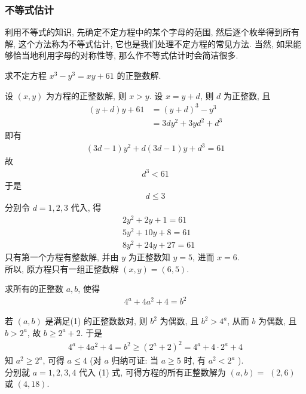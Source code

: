 \subsubsection{不等式估计}
利用不等式的知识, 先确定不定方程中的某个字母的范围, 然后逐个枚举得到所有解, 这个方法称为不等式估计, 它也是我们处理不定方程的常见方法. 当然, 如果能够恰当地利用字母的对称性等, 那么作不等式估计时会简洁很多.

\begin{example}
	求不定方程 $x^{3}-y^{3}=x y+61$ 的正整数解.
\end{example}
\begin{solution}
	设 $(x, y)$ 为方程的正整数解, 则 $x>y$. 设 $x=y+d$, 则 $d$ 为正整数, 且
	\begin{align}
		(y+d) y+61 & =(y+d)^{3}-y^{3}           \\
		           & =3 d y^{2}+3 y d^{2}+d^{3}
	\end{align}
	即有
	\begin{align*}
		(3 d-1) y^{2}+d(3 d-1) y+d^{3}=61
	\end{align*}
	故
	\begin{align*}
		d^{3}<61
	\end{align*}
	于是
	\begin{align*}
		d \leqslant 3
	\end{align*}
	分别令 $d=1 ,  2 ,  3$ 代入, 得
	\begin{align}
		 & 2 y^{2}+2 y+1=61   \\
		 & 5 y^{2}+10 y+8=61  \\
		 & 8 y^{2}+24 y+27=61
	\end{align}
	只有第一个方程有整数解, 并由 $y$ 为正整数知 $y=5$, 进而 $x=6$.\\
	所以, 原方程只有一组正整数解 $(x, y)=(6,5)$.
\end{solution}

\begin{example}
	求所有的正整数 $a ,  b$, 使得
	\begin{align*}
		4^{a}+4 a^{2}+4=b^{2}
	\end{align*}
\end{example}
\begin{solution}
	若 $(a ,  b)$ 是满足(1) 的正整数数对, 则 $b^{2}$ 为偶数, 且 $b^{2}>4^{a}$, 从而 $b$ 为偶数, 且 $b>2^{a}$, 故 $b \geqslant 2^{a}+2$. 于是
	\begin{align*}
		4^{a}+4 a^{2}+4=b^{2} \geqslant\left(2^{a}+2\right)^{2}=4^{a}+4 \cdot 2^{a}+4
	\end{align*}
	知 $a^{2} \geqslant 2^{a}$, 可得 $a \leqslant 4$ (对 $a$ 归纳可证: 当 $a \geqslant 5$ 时, 有 $a^{2}<2^{a}$ ).\\
	分别就 $a=1,2,3,4$ 代入 (1) 式, 可得方程的所有正整数解为 $(a, b)=$ $(2,6)$ 或 $(4,18)$.
\end{solution}

